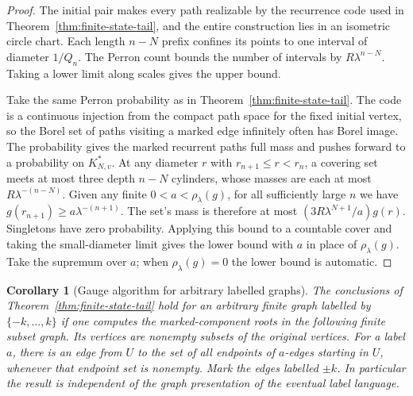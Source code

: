 \documentclass[11pt]{article}
\newtheorem{corollary}[theorem]{Corollary}
\theoremstyle{definition}
\theoremstyle{remark}
\begin{document}
\begin{proof}
The initial pair makes every path realizable by the recurrence code
used in Theorem~\ref{thm:finite-state-tail}, and the entire construction
lies in an isometric circle chart. Each length $n-N$ prefix confines
its points to one interval of diameter $1/Q_n$. The Perron count
bounds the number of intervals by $R\lambda^{n-N}$.
Taking a lower limit along scales gives the upper bound.

Take the same Perron probability as in Theorem~\ref{thm:finite-state-tail}.
The code is a continuous injection from the compact path space for the
fixed initial vertex, so the Borel set of paths visiting a marked edge
infinitely often has Borel image.
The probability gives the marked recurrent paths full mass and pushes
forward to a probability on $K^*_{N,v}$. At any diameter $r$ with
$r_{n+1}\le r<r_n$, a covering set meets at most three depth $n-N$
cylinders, whose masses are each at most $R\lambda^{-(n-N)}$.
Given any finite $0<a<\rho_\lambda(g)$, for all sufficiently large
$n$ we have $g(r_{n+1})\ge a\lambda^{-(n+1)}$. The set's mass is
therefore at most $(3R\lambda^{N+1}/a)g(r)$.
Singletons have zero probability. Applying this bound to a countable
cover and taking the small-diameter limit gives the lower bound with
$a$ in place of $\rho_\lambda(g)$. Take the supremum over $a$;
when $\rho_\lambda(g)=0$ the lower bound is automatic.
\end{proof}

\begin{corollary}[Gauge algorithm for arbitrary labelled graphs]\label{cor:finite-state-nondet}
The conclusions of Theorem~\ref{thm:finite-state-tail} hold for an
arbitrary finite graph labelled by $\{-k,\ldots,k\}$ if one computes
the marked-component roots in the following finite subset graph.
Its vertices are nonempty subsets of the original vertices. For a
label $a$, there is an edge from $U$ to the set of all endpoints of
$a$-edges starting in $U$, whenever that endpoint set is nonempty.
Mark the edges labelled $\pm k$. In particular the result is
independent of the graph presentation of the eventual label language.
\end{corollary}
\end{document}

